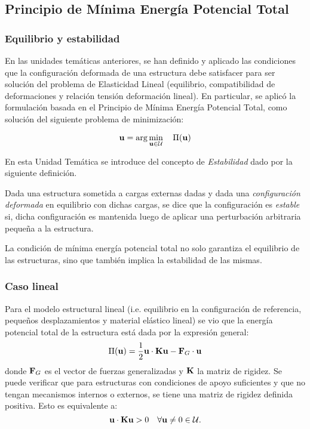\subsection{Principio de Mínima Energía Potencial Total}


\subsubsection{Equilibrio y estabilidad} 

En las unidades temáticas anteriores, se han definido y aplicado las condiciones que la configuración deformada de una estructura debe satisfacer para ser solución del problema de Elasticidad Lineal (equilibrio, compatibilidad de deformaciones y relación tensión deformación lineal). En particular, se aplicó la formulación basada en el Principio de Mínima Energía Potencial Total, como solución del siguiente problema de minimización:

\begin{equation}\label{eqn:minPi}
{\bf u} = \arg\min_{{\bf u}\in{\mathcal U}} \quad  \Pi({\bf u})
\end{equation}

En esta Unidad Temática se introduce del concepto de \textit{Estabilidad} dado por la siguiente definición.

{Dada una estructura sometida a cargas externas dadas y dada una \textit{configuración deformada} en equilibrio con dichas cargas, se dice que la configuración es \textit{estable} si, dicha configuración es mantenida luego de aplicar una perturbación arbitraria pequeña a la estructura.}

La condición de mínima energía potencial total no solo garantiza el equilibrio de las estructuras, sino que también implica la estabilidad de las mismas.

\subsubsection{Caso lineal}

Para el modelo estructural lineal (i.e. equilibrio en la configuración de referencia, pequeños desplazamientos y material elástico lineal) se vio que la energía potencial total de la estructura está dada por la expresión general:
%
\begin{equation}\label{eqn:pilineal}
\Pi({\bf u})= \frac{1}{2} {\bf u} \cdot {\bf K} {\bf u} - {\bf F}_G \cdot {\bf u}
\end{equation}
%
donde ${\bf F}_G$ es el vector de fuerzas generalizadas y ${\bf K}$ la matriz de rigidez. %
Se puede verificar que para estructuras con condiciones de apoyo suficientes y que no tengan mecanismos internos o externos, se tiene una matriz de rigidez definida positiva. Esto es equivalente a:
\begin{equation}\label{eqn:Kdefpos}
{\bf u} \cdot {\bf K} {\bf u} > 0 \quad \forall {\bf u}\neq 0 \in {\mathcal U}.
\end{equation}

